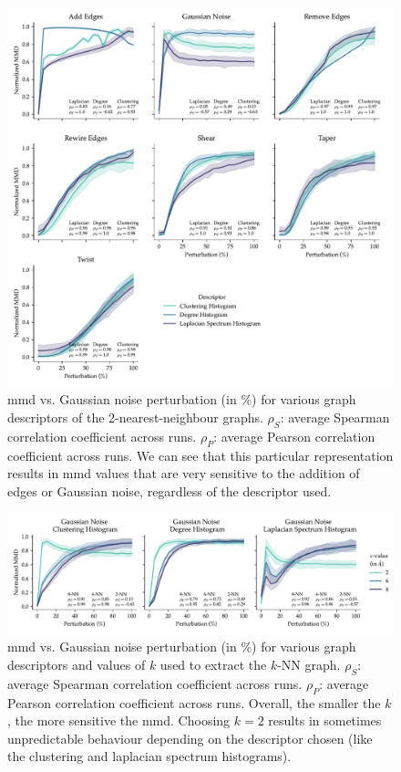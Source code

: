 \begin{figure}
  \centering
  \includegraphics[width=\textwidth]{./figures/results/res_1_3.pdf}
  \caption[2-nearest-neighbour graphs result in descriptors highly sensitive to
the addition of edges and Gaussian noise.]{\acrshort{mmd} vs. Gaussian noise perturbation
(in \%) for various graph descriptors of the 2-nearest-neighbour graphs.
$\rho_{S}$: average Spearman correlation coefficient across runs. $\rho_{P}$:
average Pearson correlation coefficient across runs. We can see that this
particular representation results in \acrshort{mmd} values that are very sensitive to the
addition of edges or Gaussian noise, regardless of the descriptor used.}
  \label{fig:mmd_k_nn_graphs}
\end{figure}

\begin{figure}
  \includegraphics[width=\textwidth]{./figures/results/res_1_4.pdf}
  \caption[Influence of $k$ on the resulting \acrshort{mmd} values.]{\acrshort{mmd} vs. Gaussian noise
perturbation (in \%) for various graph descriptors and values of $k$ used to
extract the $k$-NN graph. $\rho_{S}$: average Spearman correlation
coefficient across runs. $\rho_{P}$: average Pearson correlation coefficient
across runs. Overall, the smaller the $k$, the more sensitive the
\acrshort{mmd}. Choosing $k=2$ results in sometimes unpredictable behaviour depending on
the descriptor chosen (like the clustering and laplacian spectrum histograms).}
  \label{fig:k_vs_turbulence_gaussian_noise}

\end{figure}

